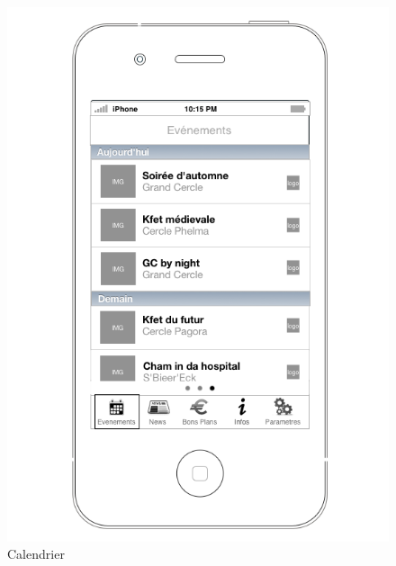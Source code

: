 \documentclass[a4paper, 11px]{article}
\begin{document}
\begin{figure}[htbp]
	\begin{minipage}[c]{.33\linewidth}
		\begin{center}
			\includegraphics[scale=0.3]{../../Sketch/iOS/evenements_liste.png}
		\end{center}
	\caption{Calendrier}
	\label{calendar}


\end{minipage}
\end{figure}
\end{document}
